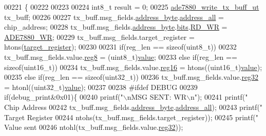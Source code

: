 \begin{DoxyCode}
00221                                                                                                            
            \{
00222       
00223       
00224     int8\_t result = 0;  
00225     \hyperlink{a00020}{ade7880\_write\_tx\_buff\_ut}  tx\_buff;
00226 
00227      tx\_buff.msg\_fields.\hyperlink{a00020_af6a65bac733ea3e9b1d24b065163d49a}{address\_byte}.\hyperlink{a00011_a7bf6defa0ae3fb2bca057a3a97d4f740}{address\_all} = chip\_address;
00228      tx\_buff.msg\_fields.\hyperlink{a00020_af6a65bac733ea3e9b1d24b065163d49a}{address\_byte}.\hyperlink{a00011_ae121725fb28cc26495969d71e0e0d42e}{bits}.\hyperlink{a00011_a97e2668c8e5470fa66185f16dc2e8045}{RD\_WR} = 
      \hyperlink{a00041_a36352e0d88dc7c5ede031013c75a678f}{ADE7880\_WR};
00229      tx\_buff.msg\_fields.target\_register = htons(\hyperlink{a00041_ac02048009fa6718e40f028b6bae63f3d}{target\_register});
00230      
00231     \textcolor{keywordflow}{if}(reg\_len == \textcolor{keyword}{sizeof}(uint8\_t))
00232       tx\_buff.msg\_fields.value.\hyperlink{a00020_a90b3f782e917edca7101e7803a3773b7}{reg8}  = (uint8\_t)\hyperlink{a00041_a638e4503e0ae6ce655b7ad2e17e8f0ad}{value};
00233     \textcolor{keywordflow}{else} \textcolor{keywordflow}{if}(reg\_len == \textcolor{keyword}{sizeof}(uint16\_t))
00234       tx\_buff.msg\_fields.value.\hyperlink{a00020_a0c22d234d52e616d449a8c264bf2030b}{reg16} = htons((uint16\_t)\hyperlink{a00041_a638e4503e0ae6ce655b7ad2e17e8f0ad}{value});
00235     \textcolor{keywordflow}{else} \textcolor{keywordflow}{if}(reg\_len == \textcolor{keyword}{sizeof}(uint32\_t))
00236       tx\_buff.msg\_fields.value.\hyperlink{a00020_a83e2be8d3feb1bcbc286bfaae10ac552}{reg32} = htonl((uint32\_t)\hyperlink{a00041_a638e4503e0ae6ce655b7ad2e17e8f0ad}{value});
00237     
00238 \textcolor{preprocessor}{    #ifdef DEBUG}
00239 \textcolor{preprocessor}{}      \textcolor{keywordflow}{if}(debug\_print&0x01)\{
00240        printf(\textcolor{stringliteral}{"\(\backslash\)nMSG SENT: WR\(\backslash\)n"});
00241        printf(\textcolor{stringliteral}{"       Chip Address %
00242        tx\_buff.msg\_fields.\hyperlink{a00020_af6a65bac733ea3e9b1d24b065163d49a}{address\_byte}.\hyperlink{a00011_a7bf6defa0ae3fb2bca057a3a97d4f740}{address\_all});
00243        printf(\textcolor{stringliteral}{"       Target Register %
00244        ntohs(tx\_buff.msg\_fields.target\_register));
00245        printf(\textcolor{stringliteral}{"       Value sent  %
00246        ntohl(tx\_buff.msg\_fields.value.\hyperlink{a00020_a83e2be8d3feb1bcbc286bfaae10ac552}{reg32}));
}}}
\end{DoxyCode}
